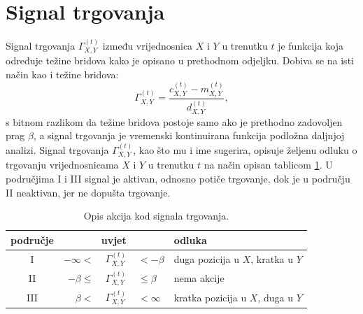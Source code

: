 \documentclass[lmodern, utf8, diplomski, numeric]{fer}
\newcommand{\q}{\left}
\newcommand{\w}{\right}
\begin{document}
  \section{Signal trgovanja}
  Signal trgovanja $\Gamma_{X, Y}^{(t)}$ između vrijednosnica $X$ i $Y$ u trenutku $t$ je funkcija koja određuje težine bridova kako je opisano u prethodnom odjeljku.
  Dobiva se na isti način kao i težine bridova:
  \begin{equation}
    \Gamma_{X, Y}^{(t)} = \frac{c_{X,Y}^{\q(t\w)} - m_{X,Y}^{\q(t\w)}}{d_{X,Y}^{\q(t\w)}},
  \end{equation}
  s bitnom razlikom da težine bridova postoje samo ako je prethodno zadovoljen prag $\beta$, a signal trgovanja je vremenski kontinuirana funkcija podložna daljnjoj analizi.
  Signal trgovanja $\Gamma_{X, Y}^{(t)}$, kao što mu i ime sugerira, opisuje željenu odluku o trgovanju vrijednosnicama $X$ i $Y$ u trenutku $t$ na način opisan tablicom \ref{table:trading-signal}.
  U područjima I i III signal je aktivan, odnosno potiče trgovanje, dok je u području II neaktivan, jer ne dopušta trgovanje.
  \begin{table}[h]
    \centering
    \caption{Opis akcija kod signala trgovanja.}
    \label{table:trading-signal}
    \begin{tabular}{cr@{}c@{}ll}
      \toprule
      područje & \multicolumn{3}{c}{uvjet} & odluka \\
      \midrule
      I & $-\infty <$ & $\,\Gamma_{X, Y}^{(t)}\,$ & $< -\beta$ & duga pozicija u $X$, kratka u $Y$ \\
      II & $-\beta \le$ & $\,\Gamma_{X, Y}^{(t)}\,$ & $\le \beta $ & nema akcije \\
      III & $\beta <$ & $\,\Gamma_{X, Y}^{(t)}\,$ & $< \infty$ & kratka pozicija u $X$, duga u $Y$ \\
      \bottomrule
    \end{tabular}
  \end{table}
\end{document}
